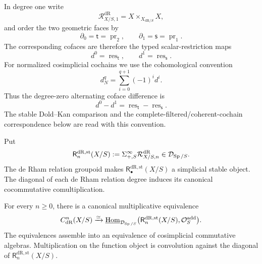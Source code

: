 \begin{convention}
In degree one write
\[
  \mathcal R^{\mathrm{dR}}_{X/S,1}=X\times_{X_{\mathrm{dR}/S}}X,
\]
and order the two geometric faces by
\[
  \partial_0=\mathsf t=\operatorname{pr}_2,
  \qquad
  \partial_1=\mathsf s=\operatorname{pr}_1.
\]
The corresponding cofaces are therefore the typed scalar-restriction maps
\[
  d^0=\operatorname{res}_{\mathsf t},
  \qquad
  d^1=\operatorname{res}_{\mathsf s}.
\]
For normalized cosimplicial cochains we use the cohomological convention
\[
  d_N^q
  =
  \sum_{i=0}^{q+1}(-1)^i d^i.
\]
Thus the degree-zero alternating coface difference is
\[
  d^0-d^1
  =
  \operatorname{res}_{\mathsf t}-\operatorname{res}_{\mathsf s}.
\]
The stable Dold--Kan comparison and the complete-filtered/coherent-cochain
correspondence below are read with this convention.
\end{convention}

\begin{construction}
Put
\[
  \mathsf{R}^{\mathrm{dR},\mathrm{st}}_n(X/S)
  :=
  \Sigma^\infty_{+,S}\mathcal R^{\mathrm{dR}}_{X/S,n}\in\mathcal D_{\operatorname{Sp}/S}.
\]
The de Rham relation groupoid makes \(\mathsf{R}^{\mathrm{dR},\mathrm{st}}_\bullet(X/S)\) a simplicial stable object. The
diagonal of each de Rham relation degree induces its canonical cocommutative comultiplication.
\end{construction}

\begin{theorem}
\label{thm:internal-function-cochains-expanded}
For every \(n\geq0\), there is a canonical multiplicative equivalence
\[
  C^n_{\mathrm{dR}}(X/S)
  \xrightarrow{\simeq}
  \underline{\operatorname{Hom}}_{\mathcal D_{\operatorname{Sp}/S}}
  \bigl(\mathsf{R}^{\mathrm{dR},\mathrm{st}}_n(X/S),\mathcal O_S^{\mathrm{add}}\bigr).
\]
The equivalences assemble into an equivalence of cosimplicial commutative algebras.
Multiplication on the function object is convolution against the diagonal of
\(\mathsf{R}^{\mathrm{dR},\mathrm{st}}_n(X/S)\).
\end{theorem}

